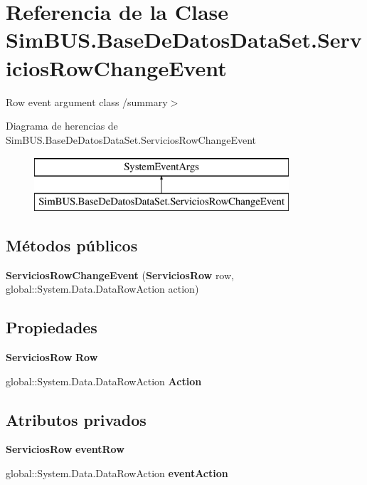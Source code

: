\section{Referencia de la Clase Sim\-B\-U\-S.\-Base\-De\-Datos\-Data\-Set.\-Servicios\-Row\-Change\-Event}
\label{class_sim_b_u_s_1_1_base_de_datos_data_set_1_1_servicios_row_change_event}


Row event argument class /summary$>$  


Diagrama de herencias de Sim\-B\-U\-S.\-Base\-De\-Datos\-Data\-Set.\-Servicios\-Row\-Change\-Event\begin{figure}[H]
\begin{center}
\leavevmode
\includegraphics[height=2.000000cm]{class_sim_b_u_s_1_1_base_de_datos_data_set_1_1_servicios_row_change_event}
\end{center}
\end{figure}
\subsection*{Métodos públicos}
\begin{DoxyCompactItemize}
\item 
{\bf Servicios\-Row\-Change\-Event} ({\bf Servicios\-Row} row, global\-::\-System.\-Data.\-Data\-Row\-Action action)
\end{DoxyCompactItemize}
\subsection*{Propiedades}
\begin{DoxyCompactItemize}
\item 
{\bf Servicios\-Row} {\bf Row}\hspace{0.3cm}{\ttfamily  [get]}
\item 
global\-::\-System.\-Data.\-Data\-Row\-Action {\bf Action}\hspace{0.3cm}{\ttfamily  [get]}
\end{DoxyCompactItemize}
\subsection*{Atributos privados}
\begin{DoxyCompactItemize}
\item 
{\bf Servicios\-Row} {\bf event\-Row}
\item 
global\-::\-System.\-Data.\-Data\-Row\-Action {\bf event\-Action}
\end{DoxyCompactItemize}


